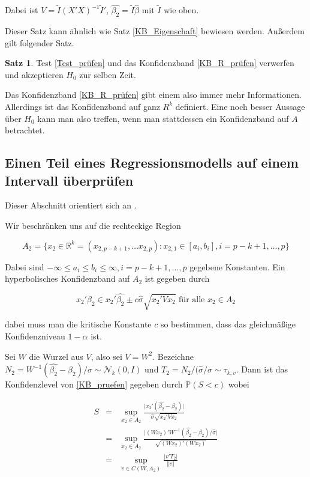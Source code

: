 \documentclass[12pt,a4paper]{article}
\theoremstyle{definition}
\theoremstyle{definition}
\newtheorem{Satz}[Definition]{Satz}
\theoremstyle{definition}
\theoremstyle{definition}
\begin{document}
Dabei ist $V=\tilde{I}(X'X)^{-1}\tilde{I}'$, $\hat{\beta_2} = \tilde{I} \hat{\beta}$ mit $\tilde{I}$ wie oben. 

Dieser Satz kann ähnlich wie Satz \ref{KB_Eigenschaft} bewiesen werden. Außerdem gilt folgender Satz.

\begin{Satz}
Test \eqref{Test_prüfen} und das Konfidenzband \eqref{KB_R_prüfen} verwerfen und akzeptieren $H_0$ zur selben Zeit.
\end{Satz}

Das Konfidenzband \eqref{KB_R_prüfen} gibt einem also immer mehr Informationen. Allerdings ist das Konfidenzband auf ganz $R^k$ definiert. Eine noch besser Aussage über $H_0$ kann man also treffen, wenn man stattdessen ein Konfidenzband auf $A$ betrachtet. 

\subsection{Einen Teil eines Regressionsmodells auf einem Intervall überprüfen}
\label{Teil eines Regressionsmodells auf einem Intervall überpruefen}
Dieser Abschnitt orientiert sich an \cite[102-105]{Liu64}.

Wir beschränken uns auf die rechteckige Region

\begin{equation*}
A_2 = \{ x_2 \in \mathbb{R}^k =(x_{2,p-k+1}, \ldots x_{2,p}) : x_{2,1} \in [a_i,b_i], i=p-k+1, \ldots, p \}
\end{equation*}

Dabei sind $- \infty \leq a_i \leq b_i \leq \infty, i = p-k+1, \ldots, p$ gegebene Konstanten. Ein hyperbolisches Konfidenzband auf $A_2$ ist gegeben durch

\begin{equation}\label{KB_pruefen}
x_2'\beta_2 \in x_2'\hat{\beta_2} \pm c \hat{\sigma}\sqrt{x_2'Vx_2} \text{ für alle } x_2 \in A_2
\end{equation}

dabei muss man die kritische Konstante $c$ so bestimmen, dass das gleichmäßige Konfidenzniveau $1 - \alpha$ ist.

Sei $W$ die Wurzel aus $V$, also sei $V=W^2$. Bezeichne $N_2=W^{-1}(\hat{\beta_2}-\beta_2)/\sigma \sim \mathscr{N}_{k}(0,I)$ und $T_2 = N_2/(\hat{\sigma}/\sigma \sim \tau_{k,v}$. Dann ist das Konfidenzlevel von \eqref{KB_pruefen} gegeben durch $\mathbb{P}(S<c)$ wobei

\begin{eqnarray*}
S &=& \sup_{x_2 \in A_2} \frac{\vert x_2' (\hat{\beta_2} - \beta_2) \vert }{\hat{\sigma} \sqrt{x_2' V  x_2}} \\
&=& \sup_{x_2 \in A_2} \frac{\vert (Wx_2)'W^{-1} (\hat{\beta_2}-\beta_2)/\hat{\sigma} \vert}{\sqrt{(Wx_2)'(Wx_2)}} \\
&=& \sup_{v \in C(W,A_2)} \frac{\vert v'T_2 \vert }{\Vert v \Vert}
\end{eqnarray*}
\end{document}
